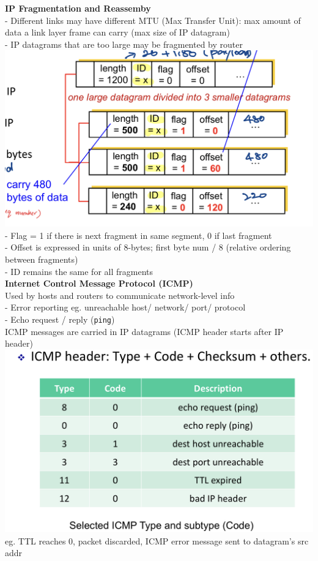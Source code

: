 \documentclass[10pt, a4paper]{article}
\newcommand{\blue}[1]{{\color{MidnightBlue}#1}}
\newcommand{\red}[1]{{\color{red}#1}}
\begin{document}
\begin{multicols*}{3}
		\textbf{IP Fragmentation and Reassemby}\\
		- Different links may have different \blue{MTU} (Max Transfer Unit): max amount of data a link layer frame can carry (max size of IP datagram)\\
		- IP datagrams that are too large may be fragmented by router\\
		\includegraphics[scale=.15]{./assets/ipFragmentation}\\
		- Flag = 1 if there is next fragment in same segment, 0 if last fragment\\
		- Offset is expressed in units of \red{8-bytes}; first byte num / 8 (relative ordering between fragments)\\
		- ID remains the same for all fragments\\

		\textbf{Internet Control Message Protocol (ICMP)}\\
		Used by hosts and routers to communicate network-level info\\
		- Error reporting eg. unreachable host/ network/ port/ protocol\\
		- Echo request / reply (\texttt{ping})\\
		ICMP messages are carried in IP datagrams (ICMP header starts after IP header)\\
		\includegraphics[scale=.14]{./assets/icmp}\\
		eg. TTL reaches 0, packet discarded, ICMP error message sent to datagram's src addr\\


\end{multicols*}
\end{document}
